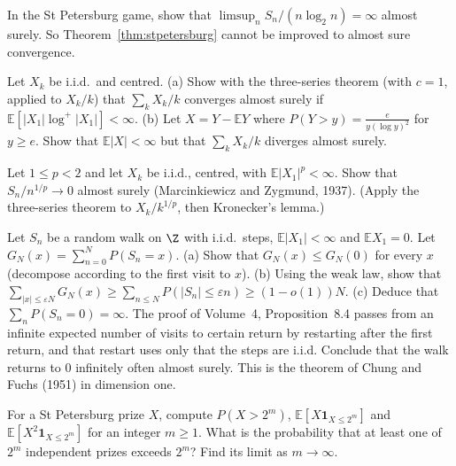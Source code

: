 \begin{exercise}[$\star\star$]\label{ex:stpeteas}
In the St Petersburg game, show that $\limsup_nS_n/(n\log_2n)=\infty$ almost surely. So Theorem~\ref{thm:stpetersburg} cannot be improved to almost sure
convergence.
\end{exercise}

\begin{exercise}[$\star\star$]\label{ex:seriesiid}
Let $X_k$ be i.i.d.\ and centred. (a) Show with the three-series theorem (with $c=1$, applied to $X_k/k$) that $\sum_kX_k/k$ converges almost surely
if $\mathbb E[|X_1|\log^+|X_1|]<\infty$. (b) Let $X=Y-\mathbb E Y$ where $P(Y>y)=\frac e{y(\log y)^2}$ for $y\ge e$. Show that $\mathbb E|X|<\infty$ but that
$\sum_kX_k/k$ diverges almost surely.
\end{exercise}

\begin{exercise}[$\star\star\star$]\label{ex:mz}
Let $1\le p<2$ and let $X_k$ be i.i.d., centred, with $\mathbb E|X_1|^p<\infty$. Show that $S_n/n^{1/p}\to0$ almost surely (Marcinkiewicz and
Zygmund, 1937). (Apply the three-series theorem to $X_k/k^{1/p}$, then Kronecker's lemma.)
\end{exercise}

\begin{exercise}[$\star\star\star$]\label{ex:chungfuchs}
Let $S_n$ be a random walk on $\Z$ with i.i.d.\ steps, $\mathbb E|X_1|<\infty$ and $\mathbb E X_1=0$. Let $G_N(x)=\sum_{n=0}^NP(S_n=x)$. (a) Show that
$G_N(x)\le G_N(0)$ for every $x$ (decompose according to the first visit to $x$). (b) Using the weak law, show that
$\sum_{|x|\le\varepsilon N}G_N(x)\ge\sum_{n\le N}P(|S_n|\le\varepsilon n)\ge(1-o(1))N$. (c) Deduce that $\sum_nP(S_n=0)=\infty$. The proof of Volume~4, Proposition~8.4 passes from an infinite expected number of visits to certain return by restarting after the first return, and that restart uses only that the steps are i.i.d. Conclude that the walk returns to $0$ infinitely often almost surely. This is the theorem of Chung and Fuchs (1951) in dimension one.
\end{exercise}


\begin{exercise}[$\star$]\label{ex:v11-ch02-cutoff}
For a St Petersburg prize $X$, compute $P(X>2^m)$, $\mathbb E[X\mathbf1_{X\le2^m}]$ and $\mathbb E[X^2\mathbf1_{X\le2^m}]$ for an integer $m\ge1$. What is the probability that at least one of $2^m$ independent prizes exceeds $2^m$? Find its limit as $m\to\infty$.
\end{exercise}

